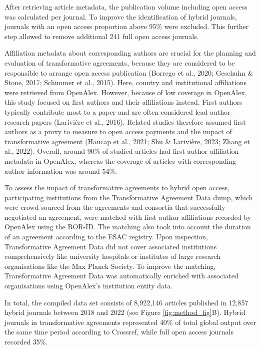 \documentclass[a4paper,man,floatsintext,longtable,noextraspace,12pt]{apa6}
\begin{document}
After retrieving article metadata, the publication volume including open
access was calculated per journal. To improve the identification of
hybrid journals, journals with an open access proportion above 95\% were
excluded. This further step allowed to remove additional 241 full open
access journals.

Affiliation metadata about corresponding authors are crucial for the
planning and evaluation of transformative agreements, because they are
considered to be responsible to arrange open access publication (Borrego
et al., 2020; Geschuhn \& Stone, 2017; Schimmer et al., 2015). Here,
country and institutional affiliations were retrieved from OpenAlex.
However, because of low coverage in OpenAlex, this study focused on
first authors and their affiliations instead. First authors typically
contribute most to a paper and are often considered lead author research
papers (Larivière et al., 2016). Related studies therefore assumed first
authors as a proxy to measure to open access payments and the impact of
transformative agreement (Haucap et al., 2021; Shu \& Larivière, 2023;
Zhang et al., 2022). Overall, around 90\% of studied articles had first
author affiliation metadata in OpenAlex, whereas the coverage of
articles with corresponding author information was around 54\%.

To assess the impact of transformative agreements to hybrid open access,
participating institutions from the Transformative Agreement Data dump,
which were crowd-sourced from the agreements and consortia that
successfully negotiated an agreement, were matched with first author
affiliations recorded by OpenAlex using the ROR-ID. The matching also
took into account the duration of an agreement according to the ESAC
registry. Upon inspection, Transformative Agreement Data did not cover
associated institutions comprehensively like university hospitals or
institutes of large research organisations like the Max Planck Society.
To improve the matching, Transformative Agreement Data was automatically
enriched with associated organisations using OpenAlex's institution
entity data.

In total, the compiled data set consists of 8,922,146 articles published
in 12,857 hybrid journals between 2018 and 2022 (see Figure
\ref{fig:method_fig}B). Hybrid journals in transformative agreements
represented 40\% of total global output over the same time period
according to Crossref, while full open access journals recorded 35\%.
\end{document}
